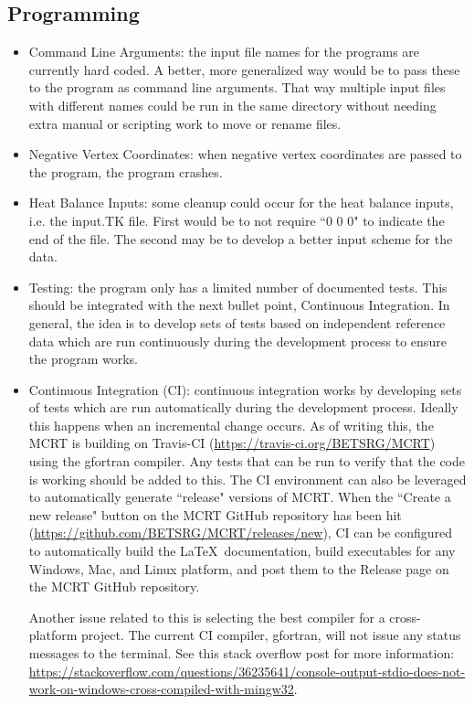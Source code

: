 \documentclass{article}
\begin{document}
\subsection{Programming}

\begin{itemize}
    \item Command Line Arguments: the input file names for the programs are currently hard coded. A better, more generalized way would be to pass these to the program as command line arguments. That way multiple input files with different names could be run in the same directory without needing extra manual or scripting work to move or rename files.

    \item Negative Vertex Coordinates: when negative vertex coordinates are passed to the program, the program crashes.

    \item Heat Balance Inputs: some cleanup could occur for the heat balance inputs, i.e. the input.TK file. First would be to not require ``0 0 0" to indicate the end of the file. The second may be to develop a better input scheme for the data.

    \item Testing: the program only has a limited number of documented tests. This should be integrated with the next bullet point, Continuous Integration. In general, the idea is to develop sets of tests based on independent reference data which are run continuously during the development process to ensure the program works.

    \item Continuous Integration (CI): continuous integration works by developing sets of tests which are run automatically during the development process. Ideally this happens when an incremental change occurs. As of writing this, the MCRT is building on Travis-CI (\url{https://travis-ci.org/BETSRG/MCRT}) using the gfortran compiler. Any tests that can be run to verify that the code is working should be added to this. The CI environment can also be leveraged to automatically generate ``release" versions of MCRT. When the ``Create a new release" button on the MCRT GitHub repository has been hit (\url{https://github.com/BETSRG/MCRT/releases/new}), CI can be configured to automatically build the \LaTeX ~documentation, build executables for any Windows, Mac, and Linux platform, and post them to the Release page on the MCRT GitHub repository.
    
    Another issue related to this is selecting the best compiler for a cross-platform project. The current CI compiler, gfortran, will not issue any status messages to the terminal. See this stack overflow post for more information: \url{https://stackoverflow.com/questions/36235641/console-output-stdio-does-not-work-on-windows-cross-compiled-with-mingw32}.


\end{itemize}
\end{document}
